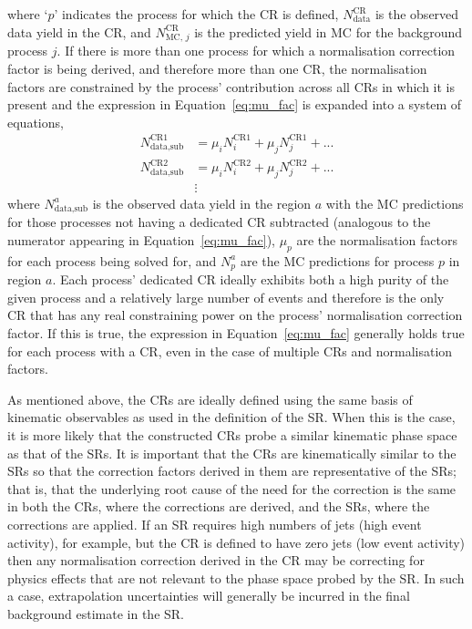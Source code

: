 where `$p$' indicates the process for which the CR is defined, $N_{\text{data}}^{\text{CR}}$ is the observed
data yield in the CR, and $N_{\text{MC},\,j}^{\text{CR}}$ is the predicted yield in MC for the background
process $j$.
If there is more than one process for which a normalisation correction factor is being derived, and therefore
more than one CR, the normalisation factors are constrained by the process' contribution across all CRs in which
it is present and the expression in Equation~\ref{eq:mu_fac} is expanded into a system of equations,
\begin{align}
    N_{\text{data,sub}}^{\text{CR1}} &= \mu_i N_i^{\text{CR1}} + \mu_j N_j^{\text{CR1}} + ... \nonumber \\
    N_{\text{data,sub}}^{\text{CR2}} &= \mu_i N_i^{\text{CR2}} + \mu_j N_j^{\text{CR2}} + ... \\
    \label{eq:mu_fac_expand}
        &\vdots \nonumber
\end{align}
where $N_{\text{data,sub}}^{a}$ is the observed data yield in the region $a$ with the MC predictions
for those processes not having a dedicated  CR subtracted (analogous to the numerator appearing in Equation~\ref{eq:mu_fac}),
$\mu_p$ are the normalisation factors for each process being solved for, and $N_p^{a}$ are the MC predictions
for process $p$ in region $a$.
Each process' dedicated CR ideally exhibits both a high purity of the given process and a relatively large
number of events and therefore {\color{red}{too large may indicate large extrapolation}}
is the only CR that has any real constraining power on the process' normalisation correction factor.
If this is true, the expression in Equation~\ref{eq:mu_fac} generally holds true for each process with a
CR, even in the case of multiple CRs and
normalisation factors.

As mentioned above, the CRs are ideally defined using the same basis of kinematic observables
as used in the definition of the SR.
When this is the case, it is more likely that the constructed CRs probe a similar kinematic
phase space as that of the SRs.
It is important that the CRs are kinematically similar to the SRs so that the correction factors
derived in them are representative of the SRs; that is, that the underlying root cause of the need for the
correction is the same in both the CRs, where the corrections are derived, and the SRs, where
the corrections are applied.
If an SR requires high numbers of jets (high event activity), for example, but the CR is defined to have zero
jets (low event activity) then any normalisation correction derived in the CR may be correcting for physics effects
that are not relevant to the phase space probed by the SR.
In such a case, extrapolation uncertainties will generally be incurred in the final background estimate in the SR.

